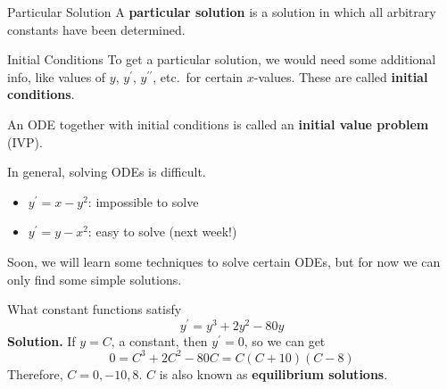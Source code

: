\begin{Definition}{Particular Solution}{}
    A \textbf{particular solution} is a solution in which all arbitrary constants
    have been determined.
\end{Definition}

\begin{Definition}{Initial Conditions}{}
    To get a particular solution, we would need some additional info, like values of $ y $,
    $ y^\prime $, $ y^{\prime\prime} $, etc.\ for certain $ x $-values. These are
    called \textbf{initial conditions}.
\end{Definition}

An ODE together with initial conditions is called an \textbf{initial value problem} (IVP).

In general, solving ODEs is difficult.
\begin{Example}{}{}
    \begin{itemize}
        \item $ y^{\prime}=x-y^2 $: impossible to solve
        \item $ y^\prime=y-x^2 $: easy to solve (next week!)
    \end{itemize}
\end{Example}

Soon, we will learn some techniques to solve certain ODEs, but for now we can
only find some simple solutions.

\begin{Example}{}{}
    What constant functions satisfy
    \[ y^\prime=y^3+2y^2-80y \]
    \textbf{Solution.} If $ y=C $, a constant, then $ y^\prime=0 $, so we can get
    \[ 0=C^3+2C^2-80C=C(C+10)(C-8) \]
    Therefore, $ C=0,-10,8 $. $ C $ is also known as \textbf{equilibrium solutions}.
\end{Example}

